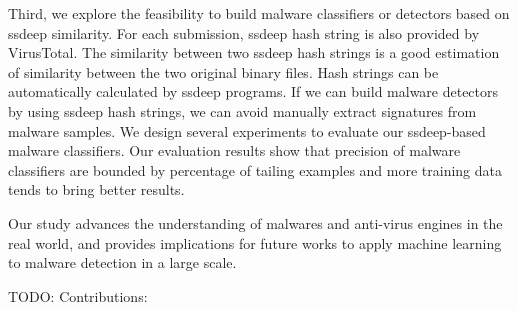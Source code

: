 Third, we explore the feasibility to build malware classifiers or detectors based on ssdeep similarity. 
For each submission, ssdeep hash string is also provided by VirusTotal. 
The similarity between two ssdeep hash strings 
is a good estimation of similarity between the two original binary files.
Hash strings can be automatically calculated by ssdeep programs. 
If we can build malware detectors by using ssdeep hash strings, 
we can avoid manually extract signatures from malware samples.   
We design several experiments to evaluate our ssdeep-based malware classifiers. 
Our evaluation results show that precision of malware classifiers are 
bounded by percentage of tailing examples and more training data tends to bring better results.

Our study advances the understanding of malwares and anti-virus engines in the real world, 
and provides implications for future works to 
apply machine learning to malware detection in a large scale. 

{\color{red} TODO: Contributions:}
